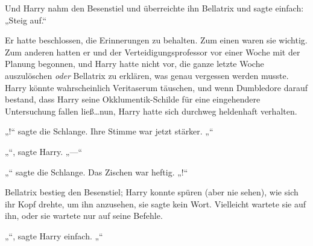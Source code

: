 Und Harry nahm den Besenstiel und überreichte ihn Bellatrix und sagte einfach:
„Steig auf.“

Er hatte beschlossen, die Erinnerungen zu behalten. Zum einen waren sie wichtig. Zum anderen hatten er und der Verteidigungsprofessor vor einer Woche mit der Planung begonnen, und Harry hatte nicht vor, die ganze letzte Woche auszulöschen \emph{oder} Bellatrix zu erklären, was genau vergessen werden musste. Harry könnte wahrscheinlich Veritaserum täuschen, und wenn Dumbledore darauf bestand, dass Harry seine Okklumentik-Schilde für eine eingehendere Untersuchung fallen ließ…nun, Harry hatte sich durchweg heldenhaft verhalten.

„!“ sagte die Schlange. Ihre Stimme war jetzt stärker. „“

„“, sagte Harry. „—“

„“ sagte die Schlange. Das Zischen war heftig. „!“

Bellatrix bestieg den Besenstiel; Harry konnte spüren (aber nie sehen), wie sich ihr Kopf drehte, um ihn anzusehen, sie sagte kein Wort. Vielleicht wartete sie auf ihn, oder sie wartete nur auf seine Befehle.

„“, sagte Harry einfach. „“


